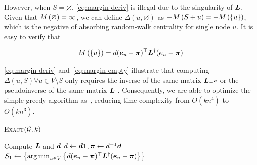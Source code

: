 \documentclass[sigconf]{acmart}
\begin{document}
However, when \(S=\varnothing\), \eqref{eq:margin-deriv} is illegal due to the singularity of \(\boldsymbol{L}\). Given that \(M\left(\varnothing\right)=\infty\), we can define \(\Delta(u,\varnothing)\) as \(-M\left(S+u\right)=-M\left(\left\{u \right\}\right)\), which is the negative of absorbing random-walk centrality for single node \(u\). It is easy to verify that~\cite{ZhXuZh20}

\begin{equation}\label{eq:margin-empty}
    M\left(\left\{u \right\}\right)=d(\boldsymbol{e}_u-\boldsymbol{\pi})^\top\boldsymbol{L}^\dagger(\boldsymbol{e}_u-\boldsymbol{\pi})
\end{equation}

\eqref{eq:margin-deriv} and~\eqref{eq:margin-empty} illustrate that computing \(\Delta(u,S)\forall u\in V\setminus S\) only requires the inverse of the same matrix \(\boldsymbol{L}_{-S}\) or the pseudoinverse of the same matrix \(\boldsymbol{L}\) . Consequently, we are able to optimize the simple greedy algorithm as~, reducing time complexity from \(O(kn^4)\) to \(O(kn^3)\).

\begin{algorithm}
    \caption{\textsc{Exact}\((\mathcal{G},k)\)}
    \label{algo:exact}
    Compute \(\boldsymbol{L}\) and \(\boldsymbol{d}\)\;
    \(d\gets\boldsymbol{d}\boldsymbol{1}\),\(\boldsymbol{\pi}\gets d^{-1}\boldsymbol{d}\)\;
    \(S_1\gets\left\{\operatorname*{arg\,min}_{u\in V}\left\{d(\boldsymbol{e}_u-\boldsymbol{\pi})^\top\boldsymbol{L}^\dagger(\boldsymbol{e}_u-\boldsymbol{\pi}) \right\} \right\}\)\;
\end{algorithm}
\end{document}

